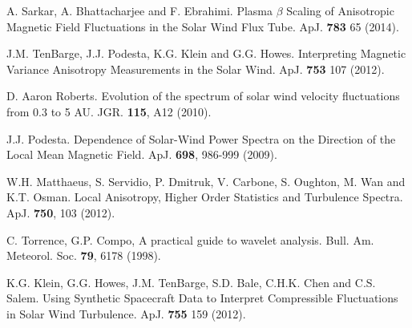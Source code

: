 \documentclass[aip,prl,amsmath,amssymb,reprint,superscriptaddress]{revtex4-1} %
\begin{document}
\begin{thebibliography}{99}
A. Sarkar, A. Bhattacharjee and F. Ebrahimi. Plasma $\beta$ Scaling of Anisotropic Magnetic Field Fluctuations in the Solar Wind Flux Tube. ApJ. {\bf 783} 65 (2014).

 J.M. TenBarge, J.J. Podesta, K.G. Klein and G.G. Howes. Interpreting Magnetic Variance Anisotropy Measurements in the Solar Wind. ApJ. {\bf 753} 107 (2012).

D. Aaron Roberts. Evolution of the spectrum of solar wind velocity fluctuations from 0.3 to 5 AU. JGR. {\bf 115}, A12 (2010).

J.J. Podesta. Dependence of Solar-Wind Power Spectra on the Direction of the Local Mean Magnetic Field. ApJ. {\bf 698}, 986-999 (2009).

W.H. Matthaeus, S. Servidio, P. Dmitruk, V. Carbone, S. Oughton, M. Wan and K.T. Osman. Local Anisotropy, Higher Order Statistics and Turbulence Spectra. ApJ. {\bf 750}, 103 (2012).

C. Torrence, G.P. Compo, A practical guide to wavelet analysis. Bull. Am. Meteorol. Soc. {\bf 79}, 6178 (1998).

 K.G. Klein, G.G. Howes, J.M. TenBarge, S.D. Bale, C.H.K. Chen and C.S. Salem. Using Synthetic Spacecraft Data to Interpret Compressible Fluctuations in Solar Wind Turbulence. ApJ. {\bf 755} 159 (2012).








\end{thebibliography}
\end{document}

